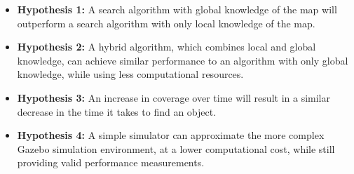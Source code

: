 \begin{itemize}
    \item \textbf{Hypothesis 1:} A search algorithm with global knowledge of the map will outperform a search algorithm with only local knowledge of the map.
    \item \textbf{Hypothesis 2:} A hybrid algorithm, which combines local and global knowledge, can achieve similar performance to an algorithm with only global knowledge, while using less computational resources.
    \item \textbf{Hypothesis 3:} An increase in coverage over time will result in a similar decrease in the time it takes to find an object.
    \item \textbf{Hypothesis 4:} A simple simulator can approximate the more complex Gazebo simulation environment, at a lower computational cost, while still providing valid performance measurements.
\end{itemize}
